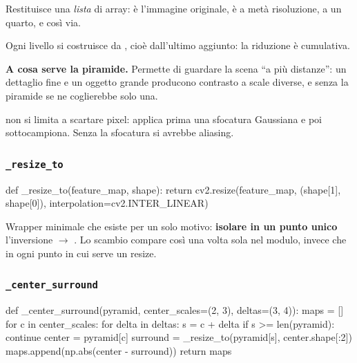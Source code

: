 Restituisce una \emph{lista} di array:  è l'immagine originale,
 è a metà risoluzione,  a un quarto, e così via.

Ogni livello si costruisce da , cioè dall'ultimo aggiunto: la riduzione è
cumulativa.

\begin{nota}
\textbf{A cosa serve la piramide.} Permette di guardare la scena ``a più distanze'': un dettaglio
fine e un oggetto grande producono contrasto a scale diverse, e senza la piramide se ne
coglierebbe solo una.

\medskip
{} non si limita a scartare pixel: applica prima una sfocatura Gaussiana e poi
sottocampiona. Senza la sfocatura si avrebbe aliasing.
\end{nota}

\subsubsection{\texttt{\_resize\_to}}

\begin{idebox}
\begin{pycode}
def _resize_to(feature_map, shape):
    return cv2.resize(feature_map, (shape[1], shape[0]),
                      interpolation=cv2.INTER_LINEAR)
\end{pycode}
\end{idebox}

Wrapper minimale che esiste per un solo motivo: \textbf{isolare in un punto unico} l'inversione
 $\to$ . Lo scambio  compare
così una volta sola nel modulo, invece che in ogni punto in cui serve un resize.

\subsubsection{\texttt{\_center\_surround}}

\begin{idebox}
\begin{pycode}
def _center_surround(pyramid, center_scales=(2, 3), deltas=(3, 4)):
    maps = []
    for c in center_scales:
        for delta in deltas:
            s = c + delta
            if s >= len(pyramid):
                continue
            center = pyramid[c]
            surround = _resize_to(pyramid[s], center.shape[:2])
            maps.append(np.abs(center - surround))
    return maps
\end{pycode}
\end{idebox}

